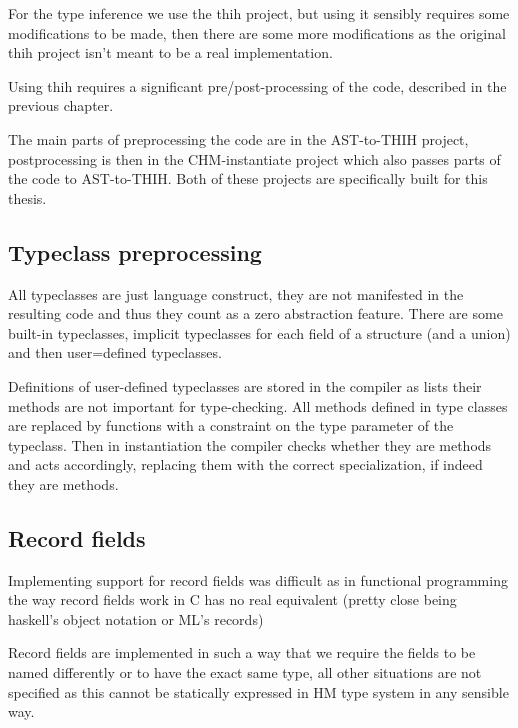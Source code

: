 For the type inference we use the thih project, %
but using it sensibly requires some modifications to be made, then there are some more modifications as the original thih project isn't meant to be a real implementation.

Using thih requires a significant pre/post-processing of the code, described in the previous chapter. %

The main parts of preprocessing the code are in the AST-to-THIH project, postprocessing is then in the CHM-instantiate project which also passes parts of the code to AST-to-THIH. Both of these projects are specifically built for this thesis.


\subsection{Typeclass preprocessing}

All typeclasses are just language construct, they are not manifested in the resulting code and thus they
count as a zero abstraction feature. There are some built-in typeclasses, %
implicit typeclasses for each field of a structure (and a union) and then user=defined typeclasses.

Definitions of user-defined typeclasses are stored in the compiler as lists their methods are not important
for type-checking. All methods defined in type classes are replaced by functions with a constraint on the type
parameter of the typeclass. Then in instantiation the compiler checks whether they are methods and acts accordingly,
replacing them with the correct specialization, if indeed they are methods.

\subsection{Record fields}

Implementing support for record fields was difficult as in functional programming the way
record fields work in C has no real equivalent (pretty close being haskell's object notation or ML's records)

Record fields are implemented in such a way that we require the fields to be named differently
or to have the exact same type, all other situations are not specified as this cannot be
statically expressed in HM type system in any sensible way.


